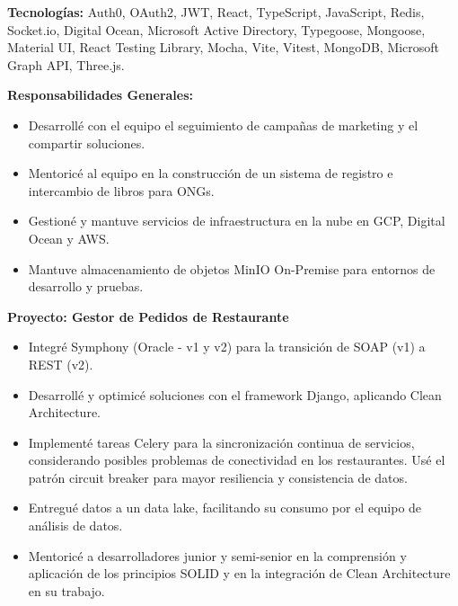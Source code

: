 \documentclass[10pt,a4paper]{altacv}
\begin{document}
\textbf{Tecnologías:} Auth0, OAuth2, JWT, React, TypeScript, JavaScript, Redis, Socket.io, Digital Ocean, Microsoft Active Directory, Typegoose, Mongoose, Material UI, React Testing Library, Mocha, Vite, Vitest, MongoDB, Microsoft Graph API, Three.js.

\vspace{5mm}

\textbf{Responsabilidades Generales:}
\begin{itemize}
    \setlength{\itemindent}{0.5em}
    \item[--] Desarrollé con el equipo el seguimiento de campañas de marketing y el compartir soluciones.
    \item[--] Mentoricé al equipo en la construcción de un sistema de registro e intercambio de libros para ONGs.
    \item[--] Gestioné y mantuve servicios de infraestructura en la nube en GCP, Digital Ocean y AWS.
    \item[--] Mantuve almacenamiento de objetos MinIO On-Premise para entornos de desarrollo y pruebas.
\end{itemize}


\textbf{Proyecto: Gestor de Pedidos de Restaurante}
\begin{itemize}
    \setlength{\itemindent}{0.5em}
    \item[--] Integré Symphony (Oracle - v1 y v2) para la transición de SOAP (v1) a REST (v2).
    \item[--] Desarrollé y optimicé soluciones con el framework Django, aplicando Clean Architecture.
   
    \break
    \newpage

    \item[--] Implementé tareas Celery para la sincronización continua de servicios, considerando posibles problemas de conectividad en los restaurantes. Usé el patrón circuit breaker para mayor resiliencia y consistencia de datos.
    \item[--] Entregué datos a un data lake, facilitando su consumo por el equipo de análisis de datos.
    \item[--] Mentoricé a desarrolladores junior y semi-senior en la comprensión y aplicación de los principios SOLID y en la integración de Clean Architecture en su trabajo.
\end{itemize}
\end{document}
